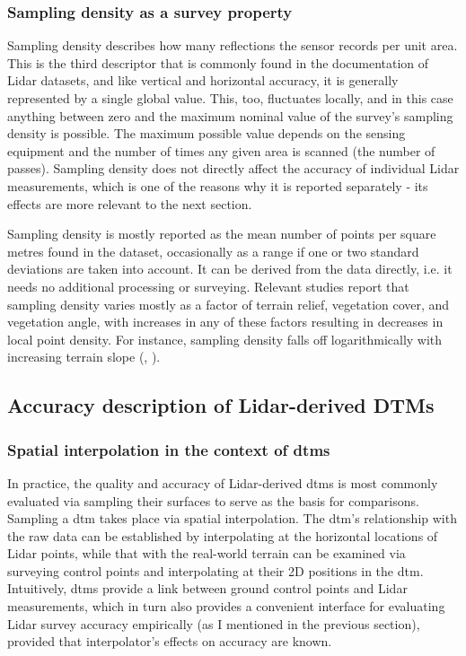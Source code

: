 \subsubsection{Sampling density as a survey property}

Sampling density describes how many reflections the sensor records per unit area. This is the third descriptor that is commonly found in the documentation of Lidar datasets, and like vertical and horizontal accuracy, it is generally represented by a single global value. This, too, fluctuates locally, and in this case anything between zero and the maximum nominal value of the survey's sampling density is possible. The maximum possible value depends on the sensing equipment and the number of times any given area is scanned (the number of passes). Sampling density does not directly affect the accuracy of individual Lidar measurements, which is one of the reasons why it is reported separately - its effects are more relevant to the next section.

Sampling density is mostly reported as the mean number of points per square metres found in the dataset, occasionally as a range if one or two standard deviations are taken into account. It can be derived from the data directly, i.e. it needs no additional processing or surveying. Relevant studies report that sampling density varies mostly as a factor of terrain relief, vegetation cover, and vegetation angle, with increases in any of these factors resulting in decreases in local point density. For instance, sampling density falls off logarithmically with increasing terrain slope (\cite{peng_shih_2006}, \cite{chow_hodgson_2009}).

\subsection{Accuracy description of Lidar-derived DTMs}
\label{sub:lidaraccuracy_dem}

\subsubsection{Spatial interpolation in the context of \ac{dtm}s}

In practice, the quality and accuracy of Lidar-derived \ac{dtm}s is most commonly evaluated via sampling their surfaces to serve as the basis for comparisons. Sampling a \ac{dtm} takes place via spatial interpolation. The \ac{dtm}'s relationship with the raw data can be established by interpolating at the horizontal locations of Lidar points, while that with the real-world terrain can be examined via surveying control points and interpolating at their 2D positions in the \ac{dtm}. Intuitively, \ac{dtm}s provide a link between ground control points and Lidar measurements, which in turn also provides a convenient interface for evaluating Lidar survey accuracy empirically (as I mentioned in the previous section), provided that interpolator's effects on accuracy are known.

